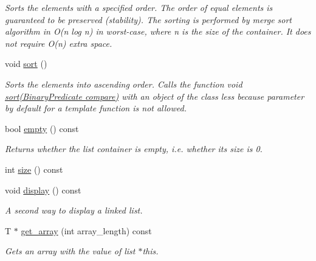 \begin{DoxyCompactItemize}
\begin{DoxyCompactList}\small\item\em Sorts the elements with a specified order. The order of equal elements is guaranteed to be preserved (stability). The sorting is performed by merge sort algorithm in {\itshape O(n log n)} in worst-\/case, where {\itshape n} is the size of the container. It does not require {\itshape O(n)} extra space. \end{DoxyCompactList}\item 
\hypertarget{classofeli_1_1list_a6b47643ddf2f9ceeb952fb6a8617daf9}{void \hyperlink{classofeli_1_1list_a6b47643ddf2f9ceeb952fb6a8617daf9}{sort} ()}\label{classofeli_1_1list_a6b47643ddf2f9ceeb952fb6a8617daf9}

\begin{DoxyCompactList}\small\item\em Sorts the elements into ascending order. Calls the function void \hyperlink{classofeli_1_1list_aaeedac18b70d233644d84c7ad3a9a3fa}{sort(\-Binary\-Predicate compare)} with an object of the class {\itshape less} because parameter by default for a template function is not allowed. \end{DoxyCompactList}\item 
\hypertarget{classofeli_1_1list_ab3e6e91f6df59f3bf1b290a36577e474}{bool \hyperlink{classofeli_1_1list_ab3e6e91f6df59f3bf1b290a36577e474}{empty} () const }\label{classofeli_1_1list_ab3e6e91f6df59f3bf1b290a36577e474}

\begin{DoxyCompactList}\small\item\em Returns whether the list container is empty, i.\-e. whether its size is 0. \end{DoxyCompactList}\item 
int \hyperlink{classofeli_1_1list_ab4901f65fa96e300ce11dc75e0760dda}{size} () const 
\item 
\hypertarget{classofeli_1_1list_ac904f35ef541477948b304f69cdc7384}{void \hyperlink{classofeli_1_1list_ac904f35ef541477948b304f69cdc7384}{display} () const }\label{classofeli_1_1list_ac904f35ef541477948b304f69cdc7384}

\begin{DoxyCompactList}\small\item\em A second way to display a linked list. \end{DoxyCompactList}\item 
\hypertarget{classofeli_1_1list_ad0f411dfb78ecfa34f66078a64f7ccb6}{T $\ast$ \hyperlink{classofeli_1_1list_ad0f411dfb78ecfa34f66078a64f7ccb6}{get\-\_\-array} (int array\-\_\-length) const }\label{classofeli_1_1list_ad0f411dfb78ecfa34f66078a64f7ccb6}

\begin{DoxyCompactList}\small\item\em Gets an array with the value of list {\itshape $\ast$this}. \end{DoxyCompactList}\end{DoxyCompactItemize}

